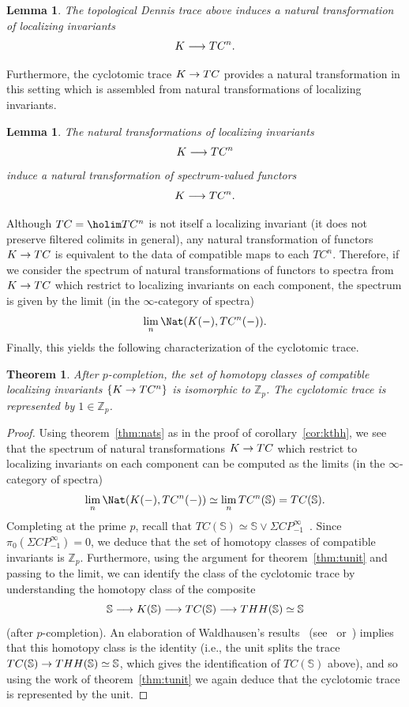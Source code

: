 \documentclass{amsart}
\newcommand{\htp}{\simeq}
\renewcommand{\to}{\mathchoice{\longrightarrow}{\rightarrow}{\rightarrow}{\rightarrow}}
\newcommand{\bbZ}{\mathbb{Z}}
\renewcommand{\i}{\infty}
\numberwithin{equation}{section}
\newtheorem{theorem}[equation]{Theorem}
\newtheorem{lemma}[equation]{Lemma}
\theoremstyle{definition}
\begin{document}
\begin{lemma}
The topological Dennis trace above induces a natural transformation of 
localizing invariants
\[
K \to TC^{n}.
\]
\end{lemma}

Furthermore, the cyclotomic trace $K \to TC$ provides a natural
transformation in this setting which is assembled from natural
transformations of localizing invariants.

\begin{lemma}
The natural transformations of localizing invariants
\[
K \to TC^{n}
\]
induce a natural transformation of spectrum-valued functors
\[
K \to TC^{n}.
\]
\end{lemma}

Although $TC = \holim TC^{n}$ is not itself a localizing invariant (it
does not preserve filtered colimits in general), any natural
transformation of  functors $K \to TC$
is equivalent to the data of compatible maps to each $TC^n$.
Therefore, if we consider the spectrum of natural transformations of
functors to spectra from $K \to TC$ which restrict to localizing
invariants on each component, the spectrum is given by the limit (in the $\i$-category of spectra)
\[
\lim_n \Nat(K(-),TC^n(-)).
\]
Finally, this yields the following characterization of the cyclotomic
trace.

\begin{theorem}
After $p$-completion, the set of homotopy classes of compatible
localizing invariants $\{K \to TC^{n}\}$ is isomorphic to $\bbZ_p$.
The cyclotomic trace is represented by $1 \in \bbZ_p$.
\end{theorem}

\begin{proof}
Using theorem~\ref{thm:nats} as in the proof of corollary~\ref{cor:kthh},
we see that the spectrum of natural transformations $K \to TC$ which
restrict to localizing invariants on each component can be computed as the limits (in the $\i$-category of spectra)
\[
\lim_n \Nat(K(-), TC^n(-)) \htp \lim_n TC^{n}(\mathbb{S}) =
TC(\mathbb{S}).
\]
Completing at the prime $p$, recall that
$TC(\mathbb{S}) \htp \mathbb{S} \vee \Sigma
CP^{\infty}_{-1}$~\cite[\S 1]{Rognes2}.  Since $\pi_0(\Sigma
CP^{\infty}_{-1}) = 0$, we deduce that the set of homotopy classes of
compatible invariants is $\bbZ_p$.  Furthermore, using the argument for
theorem~\ref{thm:tunit} and passing to the limit, we can identify the
class of the cyclotomic trace by understanding the homotopy class of
the composite
\[
\mathbb{S} \to K(\mathbb{S}) \to TC(\mathbb{S}) \to
THH(\mathbb{S}) \htp \mathbb{S}
\]
(after $p$-completion).  An elaboration of Waldhausen's
results~\cite[\S 5]{WaldA2} (see~\cite[\S5]{BokstedtHsiangMadsen}
or~\cite[\S 1]{Rognes2}) implies that this homotopy class is the
identity (i.e., the unit splits the trace $TC(\mathbb{S}) \to
THH(\mathbb{S})\htp \mathbb{S}$, which gives the identification of
$TC(\mathbb{S})$ above), and so using the work of
theorem~\ref{thm:tunit} we again deduce that the cyclotomic trace is
represented by the unit.
\end{proof}
\end{document}
